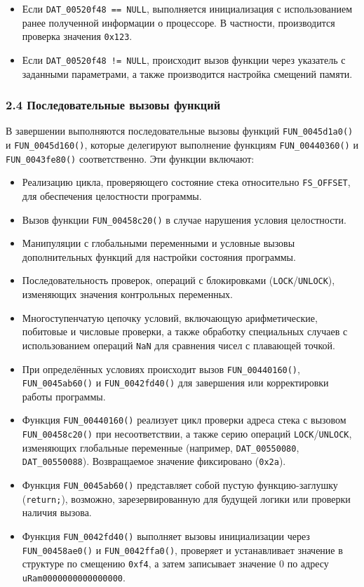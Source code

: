 \begin{itemize}
    \item Если \texttt{DAT\_00520f48 == NULL},
    выполняется инициализация с использованием ранее полученной информации о процессоре.
    В частности, производится проверка значения \texttt{0x123}.
    \item Если \texttt{DAT\_00520f48 != NULL}, происходит вызов функции через указатель с заданными параметрами,
    а также производится настройка смещений памяти.
\end{itemize}

\subsubsection*{2.4 Последовательные вызовы функций}

В завершении выполняются последовательные вызовы функций \texttt{FUN\_0045d1a0()}
и \texttt{FUN\_0045d160()}, которые делегируют выполнение функциям \texttt{FUN\_00440360()}
и \texttt{FUN\_0043fe80()} соответственно.
Эти функции включают:

\begin{itemize}
    \item Реализацию цикла, проверяющего состояние стека относительно \texttt{FS\_OFFSET}, для обеспечения целостности программы.
    \item Вызов функции \texttt{FUN\_00458c20()} в случае нарушения условия целостности.
    \item Манипуляции с глобальными переменными и условные вызовы дополнительных функций для настройки состояния программы.
    \item Последовательность проверок, операций с блокировками (\texttt{LOCK}/\texttt{UNLOCK}), изменяющих значения контрольных переменных.
    \item Многоступенчатую цепочку условий, включающую арифметические, побитовые и числовые проверки, а также обработку специальных случаев с использованием операций \texttt{NaN} для сравнения чисел с плавающей точкой.
    \item При определённых условиях происходит вызов \texttt{FUN\_00440160()}, \texttt{FUN\_0045ab60()} и \texttt{FUN\_0042fd40()} для завершения или корректировки работы программы.
    \item Функция \texttt{FUN\_00440160()} реализует цикл проверки адреса стека с вызовом \texttt{FUN\_00458c20()} при несоответствии, а также серию операций \texttt{LOCK}/\texttt{UNLOCK}, изменяющих глобальные переменные (например, \texttt{DAT\_00550080}, \texttt{DAT\_00550088}). Возвращаемое значение фиксировано (\texttt{0x2a}).
    \item Функция \texttt{FUN\_0045ab60()} представляет собой пустую функцию-заглушку (\texttt{return;}), возможно, зарезервированную для будущей логики или проверки наличия вызова.
    \item Функция \texttt{FUN\_0042fd40()} выполняет вызовы инициализации через \texttt{FUN\_00458ae0()} и \texttt{FUN\_0042ffa0()}, проверяет и устанавливает значение в структуре по смещению \texttt{0xf4}, а затем записывает значение 0 по адресу \texttt{uRam0000000000000000}.
\end{itemize}


